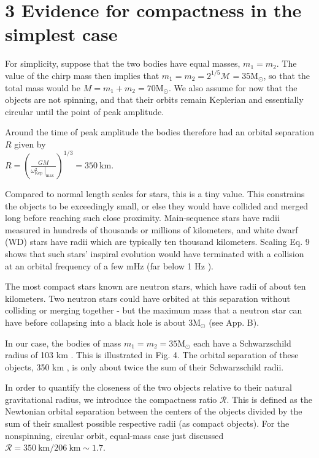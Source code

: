 \documentclass[10pt]{article}
\begin{document}
\section*{3 Evidence for compactness in the simplest case}
For simplicity, suppose that the two bodies have equal masses, $m_{1}=m_{2}$. The value of the chirp mass then implies that $m_{1}=m_{2}=2^{1 / 5} \mathscr{M}=35 \mathrm{M}_{\odot}$, so that the total mass would be $M=m_{1}+m_{2}=70 \mathrm{M}_{\odot}$. We also assume for now that the objects are not spinning, and that their orbits remain Keplerian and essentially circular until the point of peak amplitude.

Around the time of peak amplitude the bodies therefore had an orbital separation $R$ given by\\
$R=\left(\frac{G M}{\left.\omega_{\text {Kep }}^{2}\right|_{\text {max }}}\right)^{1 / 3}=350 \mathrm{~km}$.

Compared to normal length scales for stars, this is a tiny value. This constrains the objects to be exceedingly small, or else they would have collided and merged long before reaching such close proximity. Main-sequence stars have radii measured in hundreds of thousands or millions of kilometers, and white dwarf (WD) stars have radii which are typically ten thousand kilometers. Scaling Eq. 9 shows that such stars' inspiral evolution would have terminated with a collision at an orbital frequency of a few mHz (far below 1 Hz ).

The most compact stars known are neutron stars, which have radii of about ten kilometers. Two neutron stars could have orbited at this separation without colliding or merging together - but the maximum mass that a neutron star can have before collapsing into a black hole is about $3 \mathrm{M}_{\odot}$ (see App. B).

In our case, the bodies of mass $m_{1}=m_{2}=35 \mathrm{M}_{\odot}$ each have a Schwarzschild radius of 103 km . This is illustrated in Fig. 4. The orbital separation of these objects, 350 km , is only about twice the sum of their Schwarzschild radii.

In order to quantify the closeness of the two objects relative to their natural gravitational radius, we introduce the compactness ratio $\mathscr{R}$. This is defined as the Newtonian orbital separation between the centers of the objects divided by the sum of their smallest possible respective radii (as compact objects). For the nonspinning, circular orbit, equal-mass case just discussed $\mathscr{R}=350 \mathrm{~km} / 206 \mathrm{~km} \sim 1.7$.
\end{document}
